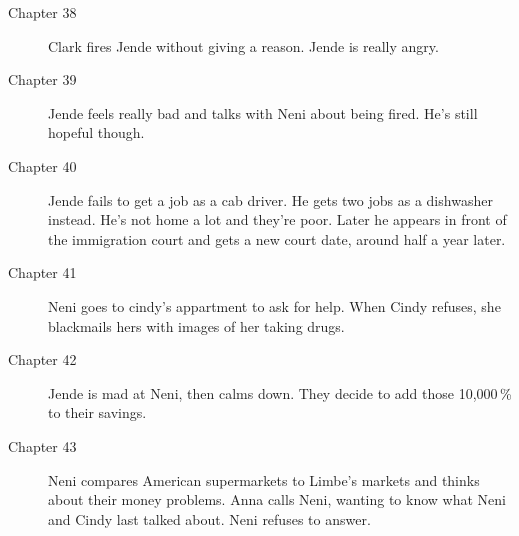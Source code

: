 \documentclass{article}
\begin{document}
\begin{description}
 \item[Chapter 38] Clark fires Jende without giving a reason. Jende is really angry.
 \item[Chapter 39] Jende feels really bad and talks with Neni about being fired. He's still hopeful though.
 \item[Chapter 40] Jende fails to get a job as a cab driver. He gets two jobs as a dishwasher instead. He's not home a lot and they're poor. Later he appears in front of the immigration court and gets a new court date, around half a year later.
 \item[Chapter 41] Neni goes to cindy's appartment to ask for help. When Cindy refuses, she blackmails hers with images of her taking drugs.
 \item[Chapter 42] Jende is mad at Neni, then calms down. They decide to add those 10,000\,\% to their savings.
 \item[Chapter 43] Neni compares American supermarkets to Limbe's markets and thinks about their money problems. Anna calls Neni, wanting to know what Neni and Cindy last talked about. Neni refuses to answer.
 
\end{description}   
\end{document}
